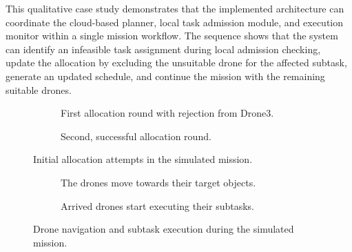 This qualitative case study demonstrates that the implemented architecture can coordinate the
cloud-based planner, local task admission module, and execution monitor within a single mission
workflow. The sequence shows that the system can identify an infeasible task assignment during
local admission checking, update the allocation by excluding the unsuitable drone for the affected
subtask, generate an updated schedule, and continue the mission with the remaining suitable drones.

\begin{landscape}
\begin{figure}[p]
    \centering

    \begin{subfigure}{0.49\linewidth}
        \centering
        \caption{First allocation round with rejection from Drone3.}
        \label{fig:frame_1}
    \end{subfigure}
    \hfill
    \begin{subfigure}{0.49\linewidth}
        \centering
        \caption{Second, successful allocation round.}
        \label{fig:frame_2}
    \end{subfigure}

    \caption{Initial allocation attempts in the simulated mission.}
    \label{fig:sim_execution_frames_1}
\end{figure}
\end{landscape}

\begin{landscape}
\begin{figure}[p]
    \centering

    \begin{subfigure}{0.49\linewidth}
        \centering
        \caption{The drones move towards their target objects.}
        \label{fig:frame_3}
    \end{subfigure}
    \hfill
    \begin{subfigure}{0.49\linewidth}
        \centering
        \caption{Arrived drones start executing their subtasks.}
        \label{fig:frame_4}
    \end{subfigure}

    \caption{Drone navigation and subtask execution during the simulated mission.}
    \label{fig:sim_execution_frames_2}
\end{figure}
\end{landscape}

